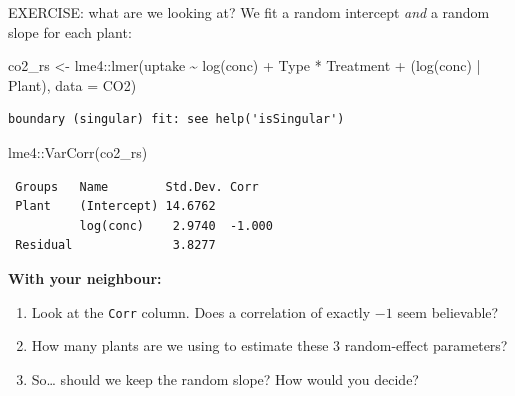\documentclass[
  ignorenonframetext,
  aspectratio=169,
]{beamer}
\newenvironment{Shaded}{\begin{snugshade}}{\end{snugshade}}
\newcommand{\AttributeTok}[1]{\textcolor[rgb]{0.40,0.45,0.13}{#1}}
\newcommand{\FunctionTok}[1]{\textcolor[rgb]{0.28,0.35,0.67}{#1}}
\newcommand{\NormalTok}[1]{\textcolor[rgb]{0.00,0.23,0.31}{#1}}
\newcommand{\OtherTok}[1]{\textcolor[rgb]{0.00,0.23,0.31}{#1}}
\newcommand{\SpecialCharTok}[1]{\textcolor[rgb]{0.37,0.37,0.37}{#1}}
\providecommand{\tightlist}{%
  \setlength{\itemsep}{0pt}\setlength{\parskip}{0pt}}\usepackage{longtable,booktabs,array}
\begin{document}
\begin{frame}[fragile]{EXERCISE: what are we looking at?}
\label{exercise-what-are-we-looking-at-1}
We fit a random intercept \emph{and} a random slope for each plant:

\begin{Shaded}
\begin{Highlighting}[]
\NormalTok{co2\_rs }\OtherTok{\textless{}{-}}\NormalTok{ lme4}\SpecialCharTok{::}\FunctionTok{lmer}\NormalTok{(uptake }\SpecialCharTok{\textasciitilde{}} \FunctionTok{log}\NormalTok{(conc) }\SpecialCharTok{+}\NormalTok{ Type }\SpecialCharTok{*}\NormalTok{ Treatment }\SpecialCharTok{+}
\NormalTok{                         (}\FunctionTok{log}\NormalTok{(conc) }\SpecialCharTok{|}\NormalTok{ Plant), }\AttributeTok{data =}\NormalTok{ CO2)}
\end{Highlighting}
\end{Shaded}

\begin{verbatim}
boundary (singular) fit: see help('isSingular')
\end{verbatim}

\begin{Shaded}
\begin{Highlighting}[]
\NormalTok{lme4}\SpecialCharTok{::}\FunctionTok{VarCorr}\NormalTok{(co2\_rs)}
\end{Highlighting}
\end{Shaded}

\begin{verbatim}
 Groups   Name        Std.Dev. Corr   
 Plant    (Intercept) 14.6762         
          log(conc)    2.9740  -1.000 
 Residual              3.8277         
\end{verbatim}

\textbf{With your neighbour:}

\begin{enumerate}
\tightlist
\item
  Look at the \texttt{Corr} column. Does a correlation of exactly \(-1\)
  seem believable?
\item
  How many plants are we using to estimate these 3 random-effect
  parameters?
\item
  So\ldots{} should we keep the random slope? How would you decide?
\end{enumerate}
\end{frame}
\end{document}
